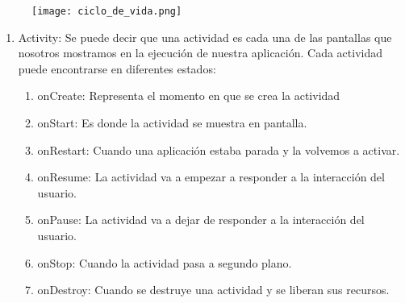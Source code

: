 \begin{figure}[h]
\texttt{[image: ciclo\_de\_vida.png]} 
\end{figure}
\begin{enumerate}

\item	Activity: Se puede decir que una actividad es cada una de las pantallas que nosotros mostramos en la ejecución de nuestra aplicación. Cada actividad puede encontrarse en diferentes estados:
\begin{enumerate}
\item	onCreate: Representa el momento en que se crea la actividad
\item	onStart: Es donde la actividad se muestra en pantalla.
\item	onRestart: Cuando una aplicación estaba parada y la volvemos a activar.
\item	onResume: La actividad va a empezar a responder a la interacción del usuario.
\item	onPause: La actividad va a dejar de responder a la interacción del usuario.
\item	onStop: Cuando la actividad pasa a segundo plano.
\item	onDestroy: Cuando se destruye una actividad y se liberan sus recursos.
\end{enumerate}





\end{enumerate}
